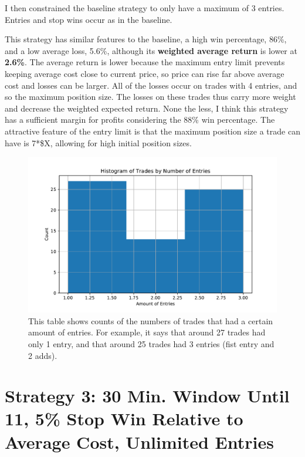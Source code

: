 \documentclass{article}
\begin{document}
I then constrained the baseline strategy to only have a maximum of 3 entries. Entries and stop wins occur as in the baseline.

This strategy has similar features to the baseline, a high win percentage, 86\%, and a low average loss, 5.6\%, although its \textbf{weighted average return} is lower at \textbf{2.6\%}. The average return is lower because the maximum entry limit prevents keeping average cost close to current price, so price can rise far above average cost and losses can be larger. All of the losses occur on trades with 4 entries, and so the maximum position size. The losses on these trades thus carry more weight and decrease the weighted expected return. None the less, I think this strategy has a sufficient margin for profits considering the 88\% win percentage. The attractive feature of the entry limit is that the maximum position size a trade can have is 7*\$X, allowing for high initial position sizes.

\begin{figure}
	\includegraphics[width=\textwidth]{prog_entry_stop_win_lim3_hist.pdf}
	\caption{This table shows counts of the numbers of trades that had a certain amount of entries. For example, it says that around 27 trades had only 1 entry, and that around 25 trades had 3 entries (fist entry and 2 adds).}
	\label{hist_strat_2}
	\end{figure}

\pagebreak

\section{Strategy 3: 30 Min. Window Until 11, 5\% Stop Win Relative to Average Cost, Unlimited Entries }
\end{document}
